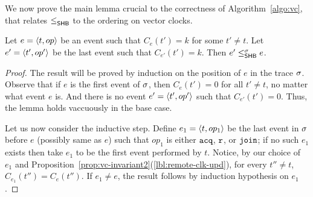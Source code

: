 We now prove the main lemma crucial to the correctness of
Algorithm~\ref{algo:vc}, that relates $\leq^{}_{\mathsf{SHB}}$ to the ordering on
vector clocks.
%
\begin{lemma}
\label{lem:vc-shb}
Let $e = \langle t,op\rangle$ be an event such that $C_e(t') = k$ for some $t'
\neq t$. Let $e' = \langle t',op'\rangle$ be the last event such that
$C_{e'}(t') = k$. Then $e' \leq^{\sigma}_{\mathsf{SHB}} e$. 
\end{lemma}
%
\begin{proof}
The result will be proved by induction on the position of $e$ in the
trace $\sigma$. Observe that if $e$ is the first event of $\sigma$, then
$C_e(t') = 0$ for all $t' \neq t$, no matter what event $e$ is. And
there is no event $e' = \langle t',op'\rangle$ such that $C_{e'}(t') = 0$. Thus,
the lemma holds vaccuously in the base case.

Let us now consider the inductive step. Define $e_1 = \langle t,op_1\rangle$ be
the last event in $\sigma$ before $e$ (possibly same as $e$) such that
$op_1$ is either $\mathtt{acq}$, $\mathtt{r}$, or $\mathtt{join}$; if no such $e_1$ exists
then take $e_1$ to be the first event performed by $t$.  Notice, by
our choice of $e_1$ and
Proposition~\ref{prop:vc-invariant2}(\ref{lbl:remote-clk-upd}), for
every $t'' \neq t$, $C_{e_1}(t'') = C_e(t'')$. If $e_1 \neq e$, the
result follows by induction hypothesis on $e_1$. 


\end{proof}
